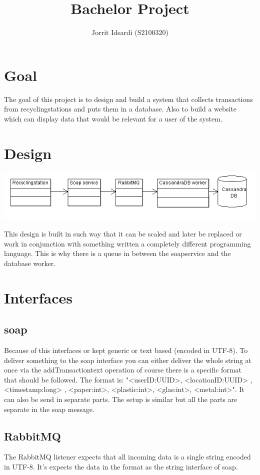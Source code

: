 \documentclass{article}
\author{Jorrit Idsardi (S2100320)}
\title{Bachelor Project}
\begin{document}
\maketitle

\section{Goal}
The goal of this project is to design and build a system that collects transactions from recyclingstations and puts them in a database. Also to build a website which can display data that would be relevant for a user of the system.

\section{Design}
\includegraphics[scale=1]{ClassDiagram.png}

This design is built in such way that it can be scaled and later be replaced or work in conjunction with something written a completely different programming language. This is why there is a queue in between the soapservice and the database worker.

\section{Interfaces}
\subsection{soap}
Because of this interfaces or kept generic or text based (encoded in UTF-8). To deliver something to the soap interface you can either deliver the whole string at once via the addTransactiontext operation of course there is a specific format that should be followed. The format is: "<userID:UUID>, <locationID:UUID> , <timestamp:long> , <paper:int>, <plastic:int>, <glas:int>, <metal:int>". It can also be send in separate parts. The setup is similar but all the parts are separate in the soap message.
\subsection{RabbitMQ}
The RabbitMQ listener expects that all incoming data is a single string encoded in UTF-8. It's expects the data in the format as the string interface of soap.
\end{document}
